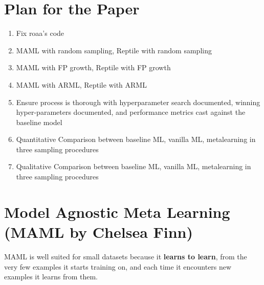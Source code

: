 \documentclass{article}
\begin{document}



\section{Plan for the Paper}
\begin{enumerate}
\item Fix roaa’s code
\item MAML with random sampling, Reptile with random sampling
\item MAML with FP growth, Reptile with FP growth
\item MAML with ARML, Reptile with ARML
\item Ensure process is thorough with hyperparameter search documented, winning hyper-parameters documented, and performance metrics cast against the baseline model
\item Quantitative Comparison between baseline ML, vanilla ML, metalearning in three sampling procedures
\item 
Qualitative Comparison between baseline ML, vanilla ML, metalearning in three sampling procedures
\end{enumerate}


\section{Model Agnostic Meta Learning (MAML by Chelsea Finn)}
MAML is well suited for small datasets because it \textbf{learns to learn}, from the very few examples it starts training on, and each time it encounters new examples it learns from them.
\end{document}
